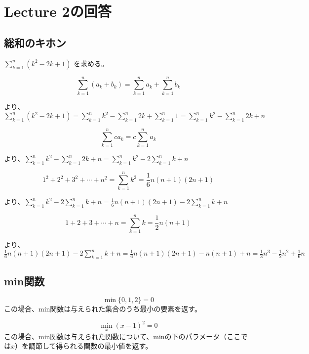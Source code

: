 \section*{Lecture 2の回答}

\subsection*{総和のキホン}

$\sum_{k=1}^n (k^2 - 2k + 1)$ を求める。

\begin{equation*}
	\sum_{k=1}^n (a_k + b_k) = \sum_{k=1}^n a_k + \sum_{k=1}^n b_k
\end{equation*} 

より、$\sum_{k=1}^n (k^2 - 2k + 1) = \sum_{k=1}^n k^2 -  \sum_{k=1}^n 2k +  \sum_{k=1}^n 1 = \sum_{k=1}^n k^2 -  \sum_{k=1}^n 2k +  n $ 

\begin{equation*}
	\sum_{k=1}^n ca_k = c\sum_{k=1}^n a_k
\end{equation*}

より、$ \sum_{k=1}^n k^2 - \sum_{k=1}^n 2k +  n = \sum_{k=1}^n k^2 - 2 \sum_{k=1}^n k + n $ 

\begin{equation*}
1^2 + 2^2 + 3^2 + \cdots + n^2 = \sum_{k=1}^n k^2
 = \frac{1}{6}n(n+1)(2n+1)	
\end{equation*}

より、$ \sum_{k=1}^n k^2 - 2 \sum_{k=1}^n k + n = \frac{1}{6}n(n+1)(2n+1) - 2 \sum_{k=1}^n k + n $

\begin{equation*}
1+2+3+\cdots + n = \sum_{k=1}^n k = \frac{1}{2}n (n+1)	
\end{equation*}

より、$ \frac{1}{6}n(n+1)(2n+1) - 2 \sum_{k=1}^n k + n = \frac{1}{6}n(n+1)(2n+1) - n(n+1) + n = \frac{1}{3}n^3 - \frac{1}{2}n^2 + \frac{1}{6}n $


\subsection*{min関数}
\begin{equation*}
	\min \{ 0, 1, 2 \} = 0
\end{equation*}
この場合、min関数は与えられた集合のうち最小の要素を返す。

\begin{equation*}
	\min_{x} (x-1)^2  = 0
\end{equation*}
この場合、min関数は与えられた関数について、minの下のパラメータ（ここでは$x$）を調節して得られる関数の最小値を返す。

